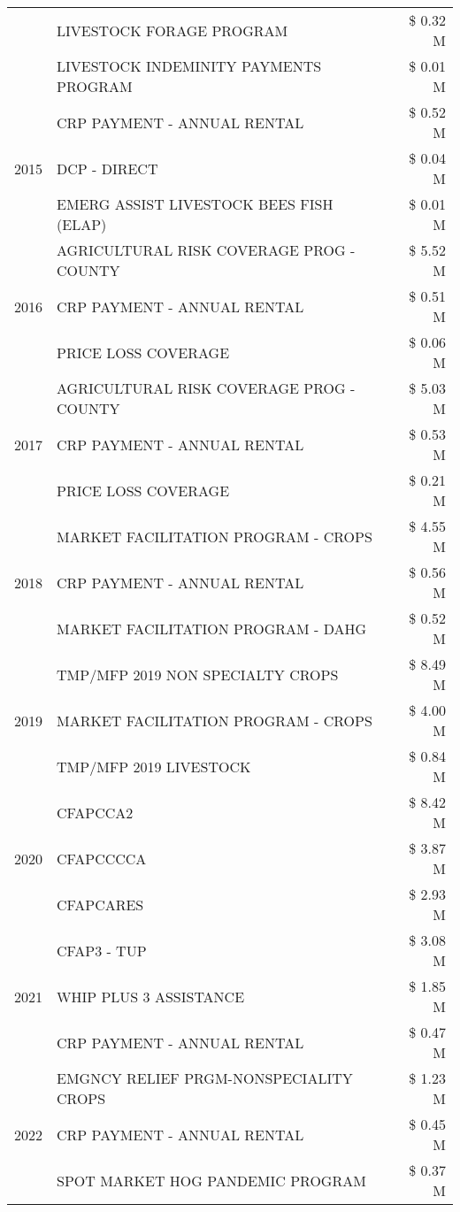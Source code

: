 \begin{tabular}{llr}
 & LIVESTOCK FORAGE PROGRAM & \$ 0.32 M \\
 & LIVESTOCK INDEMINITY PAYMENTS PROGRAM & \$ 0.01 M \\
\cline{1-3}
\multirow[t]{3}{*}{2015} & CRP PAYMENT - ANNUAL RENTAL & \$ 0.52 M \\
 & DCP - DIRECT & \$ 0.04 M \\
 & EMERG ASSIST LIVESTOCK BEES FISH (ELAP) & \$ 0.01 M \\
\cline{1-3}
\multirow[t]{3}{*}{2016} & AGRICULTURAL RISK COVERAGE PROG - COUNTY & \$ 5.52 M \\
 & CRP PAYMENT - ANNUAL RENTAL & \$ 0.51 M \\
 & PRICE LOSS COVERAGE & \$ 0.06 M \\
\cline{1-3}
\multirow[t]{3}{*}{2017} & AGRICULTURAL RISK COVERAGE PROG - COUNTY & \$ 5.03 M \\
 & CRP PAYMENT - ANNUAL RENTAL & \$ 0.53 M \\
 & PRICE LOSS COVERAGE & \$ 0.21 M \\
\cline{1-3}
\multirow[t]{3}{*}{2018} & MARKET FACILITATION PROGRAM - CROPS & \$ 4.55 M \\
 & CRP PAYMENT - ANNUAL RENTAL & \$ 0.56 M \\
 & MARKET FACILITATION PROGRAM - DAHG & \$ 0.52 M \\
\cline{1-3}
\multirow[t]{3}{*}{2019} & TMP/MFP 2019 NON SPECIALTY CROPS & \$ 8.49 M \\
 & MARKET FACILITATION PROGRAM - CROPS & \$ 4.00 M \\
 & TMP/MFP 2019 LIVESTOCK & \$ 0.84 M \\
\cline{1-3}
\multirow[t]{3}{*}{2020} & CFAPCCA2 & \$ 8.42 M \\
 & CFAPCCCCA & \$ 3.87 M \\
 & CFAPCARES & \$ 2.93 M \\
\cline{1-3}
\multirow[t]{3}{*}{2021} & CFAP3 - TUP & \$ 3.08 M \\
 & WHIP PLUS 3 ASSISTANCE & \$ 1.85 M \\
 & CRP PAYMENT - ANNUAL RENTAL & \$ 0.47 M \\
\cline{1-3}
\multirow[t]{3}{*}{2022} & EMGNCY RELIEF PRGM-NONSPECIALITY CROPS & \$ 1.23 M \\
 & CRP PAYMENT - ANNUAL RENTAL & \$ 0.45 M \\
 & SPOT MARKET HOG PANDEMIC PROGRAM & \$ 0.37 M \\
\cline{1-3}
\bottomrule
\end{tabular}
